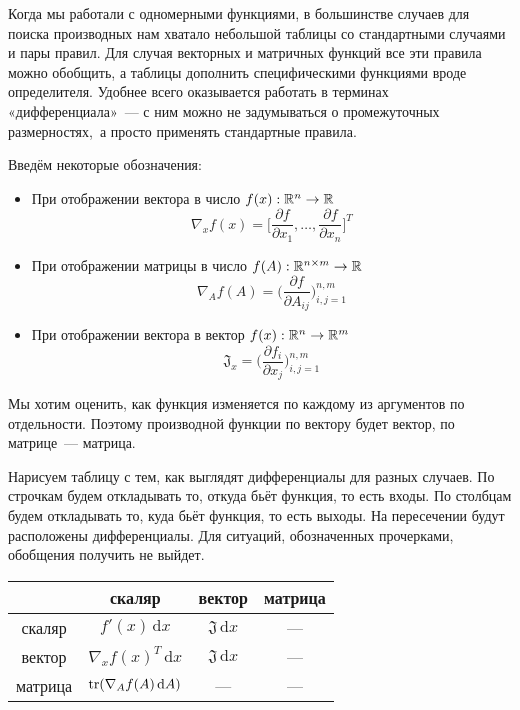 \documentclass[12pt,fleqn]{article}
\newcommand{\dx}[1]{\,\mathrm{d}#1} %
\begin{document}
Когда мы работали с одномерными функциями, в большинстве случаев для поиска производных нам хватало небольшой таблицы со стандартными случаями и пары правил.
Для случая векторных и матричных функций все эти правила можно обобщить, а таблицы дополнить специфическими функциями вроде определителя.
Удобнее всего оказывается работать в терминах «дифференциала»~--- с ним можно не задумываться о промежуточных размерностях,~а просто применять стандартные правила.

Введём некоторые обозначения:
\begin{itemize}
    \item При отображении вектора в число $f(x): \mathbb{R}^n \to \mathbb{R}$ 
    \[
        \nabla_x f(x)
        =
        \bigg[
            \frac{\partial f}{\partial x_1},
            \dots,
            \frac{\partial f}{\partial x_n}
        \bigg]^T
    \]

    \item При отображении матрицы в число $f(A): \RR^{n \times m} \to \RR$
    \[
        \nabla_A f(A)
        =
        \bigg(
            \frac{\partial f}{\partial A_{ij}}
        \bigg)_{i,j=1}^{n,m}
    \]
    
    \item При отображении вектора в вектор $f(x): \mathbb{R}^n \to \mathbb{R}^m$
    \[
        \mathfrak{J}_x = \bigg(
            \frac{\partial f_{i}}{\partial x_{j}}
        \bigg)_{i,j=1}^{n,m}
    \]
\end{itemize}

Мы хотим оценить, как функция изменяется по каждому из аргументов по отдельности. Поэтому производной функции по вектору будет вектор, по матрице~--- матрица.

Нарисуем таблицу с тем, как выглядят дифференциалы для разных случаев. По строчкам будем откладывать то, откуда бьёт функция, то есть входы. По столбцам будем откладывать то, куда бьёт функция, то есть выходы. На пересечении будут расположены дифференциалы. Для ситуаций, обозначенных прочерками, обобщения получить не выйдет. 

\begin{center} 
    \begin{tabular}{|c|c|c|c|}
    \hline
        & скаляр & вектор & матрица \\
    \hline 
    скаляр & $f'(x) \dx{x}$  &  $\mathfrak{J} \dx{x}$  & ---          \\
    \hline
    вектор & $ \nabla_x f(x)^T \dx{x}$    &   $\mathfrak{J} \dx{x}$     &  ---        \\
    \hline
    матрица & $\Tr( \nabla_A f(A) \dx{A})$    &    ---    & ---        \\
    \hline
    \end{tabular}
\end{center} 
\end{document}
